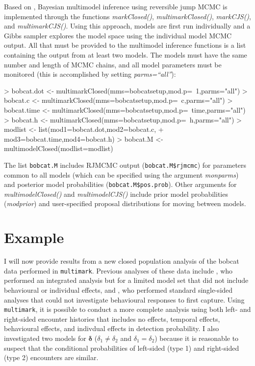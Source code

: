\documentclass[12pt]{article}
\begin{document}
Based on \cite{BarkerLink2013}, Bayesian multimodel inference using reversible jump MCMC is implemented through the functions \textit{markClosed()}, \textit{multimarkClosed()}, \textit{markCJS()}, and \textit{multimarkCJS()}. Using this approach, models are first run individually and a Gibbs sampler explores the model space using the individual model MCMC output. All that must be provided to the multimodel inference functions is a list containing the output from at least two models. The models must have the same number and length of MCMC chains, and all model parameters must be monitored (this is accomplished by setting \textit{parms=``all''}):
\begin{Schunk}
\begin{Sinput}
> bobcat.dot <- multimarkClosed(mms=bobcatsetup,mod.p=~1,parms="all")
> bobcat.c <- multimarkClosed(mms=bobcatsetup,mod.p=~c,parms="all")
> bobcat.time <- multimarkClosed(mms=bobcatsetup,mod.p=~time,parms="all")
> bobcat.h <- multimarkClosed(mms=bobcatsetup,mod.p=~h,parms="all")
> modlist <- list(mod1=bobcat.dot,mod2=bobcat.c,
+                 mod3=bobcat.time,mod4=bobcat.h)
> bobcat.M <- multimodelClosed(modlist=modlist)
\end{Sinput}
\end{Schunk}
The list \verb|bobcat.M| includes RJMCMC output (\verb|bobcat.M$rjmcmc|) for parameters common to all models (which can be specified using the argument \textit{monparms}) and posterior model probabilities (\verb|bobcat.M$pos.prob|). Other arguments for \textit{multimodelClosed()} and \textit{multimodelCJS()} include prior model probabilities (\textit{modprior}) and user-specified proposal distributions for moving between models.

\section{Example}
\label{sec:example}
I will now provide results from a new closed population analysis of the bobcat data performed in \verb|multimark|. Previous analyses of these data include \cite{McClintockEtAl2013a}, who performed an integrated analysis but for a limited model set that did not include behavioural or individual effects, and \cite{AlonsoEtAl2015}, who performed standard single-sided analyses that could not investigate behavioural responses to first capture. Using \verb|multimark|, it is possible to conduct a more complete analysis using both left- and right-sided encounter histories that includes no effects, temporal effects, behavioural effects, and indivdual effects in detection probability. I also investigated two models for ${\boldsymbol \delta}$ ($\delta_1 \ne \delta_2$ and $\delta_1 = \delta_2$) because it is reasonable to suspect that the conditional probabilities of left-sided (type 1) and right-sided (type 2) encounters are similar. 
\end{document}
